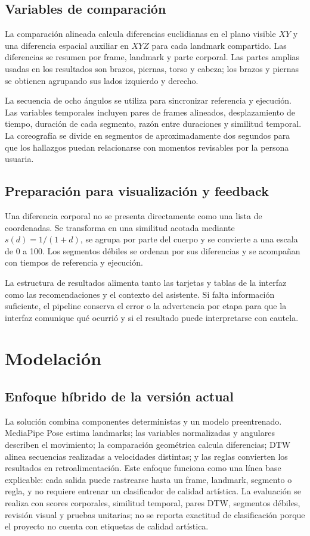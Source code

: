 \documentclass[12pt,a4paper]{article}
\begin{document}
\subsection{Variables de comparación}
La comparación alineada calcula diferencias euclidianas en el plano visible $XY$ y una diferencia espacial auxiliar en $XYZ$ para cada landmark compartido. Las diferencias se resumen por frame, landmark y parte corporal. Las partes amplias usadas en los resultados son brazos, piernas, torso y cabeza; los brazos y piernas se obtienen agrupando sus lados izquierdo y derecho.

La secuencia de ocho ángulos se utiliza para sincronizar referencia y ejecución. Las variables temporales incluyen pares de frames alineados, desplazamiento de tiempo, duración de cada segmento, razón entre duraciones y similitud temporal. La coreografía se divide en segmentos de aproximadamente dos segundos para que los hallazgos puedan relacionarse con momentos revisables por la persona usuaria.
\subsection{Preparación para visualización y feedback}
Una diferencia corporal no se presenta directamente como una lista de coordenadas. Se transforma en una similitud acotada mediante $s(d)=1/(1+d)$, se agrupa por parte del cuerpo y se convierte a una escala de 0 a 100. Los segmentos débiles se ordenan por sus diferencias y se acompañan con tiempos de referencia y ejecución.

La estructura de resultados alimenta tanto las tarjetas y tablas de la interfaz como las recomendaciones y el contexto del asistente. Si falta información suficiente, el pipeline conserva el error o la advertencia por etapa para que la interfaz comunique qué ocurrió y si el resultado puede interpretarse con cautela.

\section{Modelación}
\subsection{Enfoque híbrido de la versión actual}
La solución combina componentes deterministas y un modelo preentrenado. MediaPipe Pose estima landmarks; las variables normalizadas y angulares describen el movimiento; la comparación geométrica calcula diferencias; DTW alinea secuencias realizadas a velocidades distintas; y las reglas convierten los resultados en retroalimentación. Este enfoque funciona como una línea base explicable: cada salida puede rastrearse hasta un frame, landmark, segmento o regla, y no requiere entrenar un clasificador de calidad artística. La evaluación se realiza con scores corporales, similitud temporal, pares DTW, segmentos débiles, revisión visual y pruebas unitarias; no se reporta exactitud de clasificación porque el proyecto no cuenta con etiquetas de calidad artística.
\end{document}
